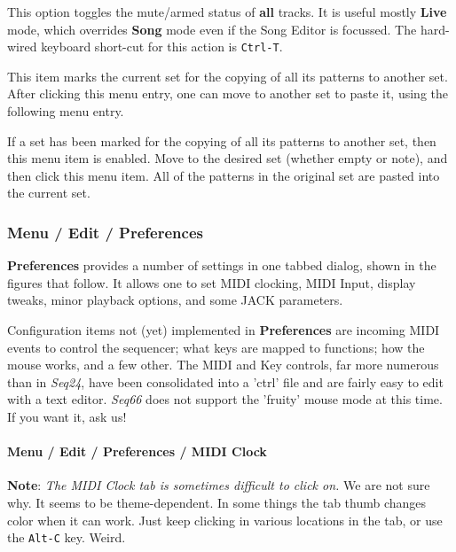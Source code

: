    This option toggles the mute/armed status of \textbf{all} tracks.
   It is useful mostly \textbf{Live} mode, which overrides \textbf{Song}
   mode even if the Song Editor is focussed.
   The hard-wired keyboard short-cut for this action is \texttt{Ctrl-T}.

   This item marks the current set for the copying of all its patterns to
   another set.
   After clicking this menu entry, one can move to another set to paste it,
   using the following menu entry.

   If a set has been marked for the copying of all its patterns to
   another set, then this menu item is enabled.
   Move to the desired set (whether empty or note), and then
   click this menu item.
   All of the patterns in the original set are pasted into the current set.

\subsubsection{Menu / Edit / Preferences}
\label{subsubsec:menu_edit_preferences}

   \textbf{Preferences} provides a number of settings in one
   tabbed dialog, shown in the figures that follow.
   It allows one to set MIDI clocking, MIDI Input, display tweaks, minor
   playback options, and some JACK parameters.

  Configuration items not (yet) implemented in \textbf{Preferences} are
      incoming MIDI events to control the sequencer;
      what keys are mapped to functions;
      how the mouse works, and a few other.
   The MIDI and Key controls, far more numerous than in \textsl{Seq24}, have
   been consolidated into a 'ctrl' file and are fairly easy to edit with a text
   editor.
   \textsl{Seq66} does not support the 'fruity' mouse mode at this time.
   If you want it, ask us!

\paragraph{Menu / Edit / Preferences / MIDI Clock}
\label{paragraph:menu_edit_preferences_midi_clock}

   \textbf{Note}:
   \textsl{The MIDI Clock tab is sometimes difficult to click on.}
   We are not sure why.  It seems to be theme-dependent.
   In some things the tab thumb changes color when it can work.
   Just keep clicking in various locations in the tab,
   or use the \texttt{Alt-C} key.
   Weird.


